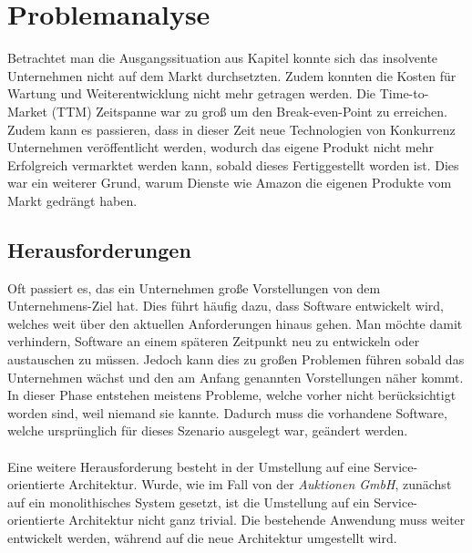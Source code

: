 \chapter{Problemanalyse}
\label{chap:analyse}
Betrachtet man die Ausgangssituation aus Kapitel  konnte sich das insolvente Unternehmen nicht auf dem Markt durchsetzten. Zudem konnten die Kosten für Wartung und Weiterentwicklung nicht mehr getragen werden. Die Time-to-Market (TTM) Zeitspanne war zu groß um den Break-even-Point zu erreichen. Zudem kann es passieren, dass in dieser Zeit neue Technologien von Konkurrenz Unternehmen veröffentlicht werden, wodurch das eigene Produkt nicht mehr Erfolgreich vermarktet werden kann, sobald dieses Fertiggestellt worden ist. Dies war ein weiterer Grund, warum Dienste wie Amazon die eigenen Produkte vom Markt gedrängt haben.

\section{Herausforderungen}
\label{sec:herausforderung}
Oft passiert es, das ein Unternehmen große Vorstellungen von dem Unternehmens-Ziel hat. Dies führt häufig dazu, dass Software entwickelt wird, welches weit über den aktuellen Anforderungen hinaus gehen. Man möchte damit verhindern, Software an einem späteren Zeitpunkt neu zu entwickeln oder austauschen zu müssen. Jedoch kann dies zu großen Problemen führen sobald das Unternehmen wächst und den am Anfang genannten Vorstellungen näher kommt. In dieser Phase entstehen meistens Probleme, welche vorher nicht berücksichtigt worden sind, weil niemand sie kannte. Dadurch muss die vorhandene Software, welche ursprünglich für dieses Szenario ausgelegt war, geändert werden.
\\\\
Eine weitere Herausforderung besteht in der Umstellung auf eine Service-orientierte Architektur. Wurde, wie im Fall von der \textit{Auktionen GmbH}, zunächst auf ein monolithisches System gesetzt, ist die Umstellung auf ein Service-orientierte Architektur nicht ganz trivial. Die bestehende Anwendung muss weiter entwickelt werden, während auf die neue Architektur umgestellt wird.

